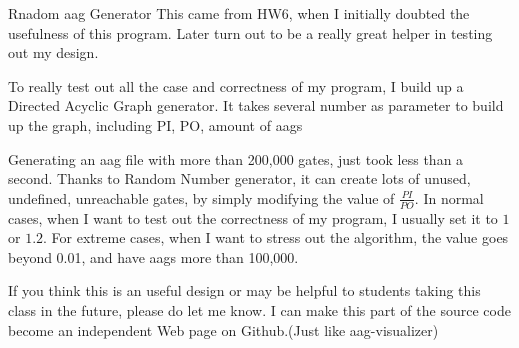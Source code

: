 \documentclass[12pt,a4paper]{report}
\begin{document}
\begin{section}{Rnadom aag Generator}
  This came from HW6, when I initially doubted the usefulness of this program. Later turn out to be a 
  really great helper in testing out my design.

  To really test out all the case and correctness of my program, I build up a Directed Acyclic Graph 
  generator. It takes several number as parameter to build up the graph, including PI, PO, amount of aags

  Generating an aag file with more than 200,000 gates, just took less than a second.
  Thanks to Random Number generator, it can create lots of unused, undefined, unreachable gates,
  by simply modifying the value of $\frac{PI}{PO}$. In normal cases, when I want to test out 
  the correctness of my program, I usually set it to $1$ or $1.2$. For extreme cases, when I want 
  to stress out the algorithm, the value goes beyond 0.01, and have aags more than 100,000.

  If you think this is an useful design or may be helpful to students taking this class in the future, 
  please do let me know. I can make this part of the source code become an
  independent Web page on Github.(Just like
  aag-visualizer)
\end{section}
\end{document}
